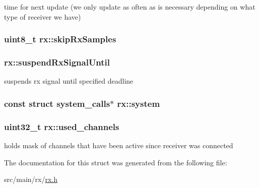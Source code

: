 time for next update (we only update as often as is necessary depending on what type of receiver we have) 

\hypertarget{structrx_aa4507aca657ffcb588ac40316458053f}{
\subsubsection[{skip\+Rx\+Samples}]{\setlength{\rightskip}{0pt plus 5cm}uint8\+\_\+t rx\+::skip\+Rx\+Samples}}\label{structrx_aa4507aca657ffcb588ac40316458053f}
\hypertarget{structrx_a0cb90543d6f91fc3640753d1b6d177d8}{
\subsubsection[{suspend\+Rx\+Signal\+Until}]{ rx\+::suspend\+Rx\+Signal\+Until}}\label{structrx_a0cb90543d6f91fc3640753d1b6d177d8}


suspends rx signal until specified deadline 

\hypertarget{structrx_a5fb9599652a09d1518e942c47bc0952c}{
\subsubsection[{system}]{\setlength{\rightskip}{0pt plus 5cm}const struct {\bf system\+\_\+calls}$\ast$ rx\+::system}}\label{structrx_a5fb9599652a09d1518e942c47bc0952c}
\hypertarget{structrx_a335d0dacc6c5be5b735d9fbc568bab94}{
\subsubsection[{used\+\_\+channels}]{\setlength{\rightskip}{0pt plus 5cm}uint32\+\_\+t rx\+::used\+\_\+channels}}\label{structrx_a335d0dacc6c5be5b735d9fbc568bab94}


holds mask of channels that have been active since receiver was connected 



The documentation for this struct was generated from the following file\+:\begin{DoxyCompactItemize}
\item 
src/main/rx/\hyperlink{rx_2rx_8h}{rx.\+h}\end{DoxyCompactItemize}
